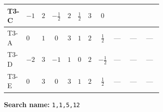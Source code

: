 \documentclass[8pt]{article}
\begin{document}
\begin{landscape}
\begin{longtable}{@{}llcccccc >{\raggedright\arraybackslash}p{0.21\linewidth} >{\raggedright\arraybackslash}p{0.21\linewidth} >{\raggedright\arraybackslash}p{0.21\linewidth}@{}}
T3-C & $-1$ & $2$ & $-\frac{1}{2}$ & $2$ & $\frac{1}{2}$ & $3$ & $0$ & \scriptsize\adjustbox{max width=\linewidth}{$\begin{gathered} \frac{i lambda12Inv2 \overline{y_{1}} \overline{y_{2}}}{3 MF}\end{gathered}$} & \scriptsize\adjustbox{max width=\linewidth}{$\begin{gathered} \frac{\sqrt{3} i g_{2}^{2} \overline{y_{1}} \overline{y_{2}}}{4 MF}\end{gathered}$} & \scriptsize\adjustbox{max width=\linewidth}{$\begin{gathered} - \frac{\sqrt{3} i ye \overline{y_{1}} \overline{y_{2}} \overline{ye}}{12 MF}\end{gathered}$} \\
\midrule
T3-A & $0$ & $1$ & $0$ & $3$ & $1$ & $2$ & $\frac{1}{2}$ & --- & --- & --- \\
\midrule
T3-D & $-2$ & $3$ & $-1$ & $1$ & $0$ & $2$ & $-\frac{1}{2}$ & --- & --- & --- \\
\midrule
T3-E & $0$ & $3$ & $0$ & $3$ & $1$ & $2$ & $\frac{1}{2}$ & --- & --- & --- \\
\midrule
\bottomrule
\end{longtable}
\clearpage
\noindent\textbf{Search name: }\texttt{1,1,5,12}\par\smallskip

\end{landscape}
\end{document}
